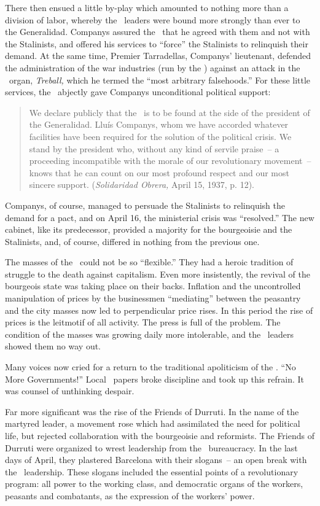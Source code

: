 There then ensued a little by-play which amounted to nothing more than a division of labor, whereby the \CNT\ leaders were bound more strongly than ever to the Generalidad. Companys assured the \CNT\ that he agreed with them and not with the Stalinists, and offered his services to ``force'' the Stalinists to relinquish their demand. At the same time, Premier Tarradellas, Companys’ lieutenant, defended the administration of the war industries (run by the \CNT) against an attack in the \PSUC\ organ, \emph{Treball,} which he termed the ``most arbitrary falsehoods.'' For these little services, the \CNT\ abjectly gave Companys unconditional political support:

\begin{quotation}
  We declare publicly that the \CNT\ is to be found at the side of the president of the Generalidad. Lluís Companys, whom we have accorded whatever facilities have been required for the solution of the political crisis. We stand by the president who, without any kind of servile praise~-- a proceeding incompatible with the morale of our revolutionary movement~-- knows that he can count on our most profound respect and our most sincere support. (\emph{Solidaridad Obrera,} April 15, 1937, p. 12).
\end{quotation}

Companys, of course, managed to persuade the Stalinists to relinquish the demand for a pact, and on April 16, the ministerial crisis was ``resolved.'' The new cabinet, like its predecessor, provided a majority for the bourgeoisie and the Stalinists, and, of course, differed in nothing from the previous one.

The masses of the \CNT\ could not be so ``flexible.'' They had a heroic tradition of struggle to the death against capitalism. Even more insistently, the revival of the bourgeois state was taking place on their backs. Inflation and the uncontrolled manipulation of prices by the businessmen ``mediating'' between the peasantry and the city masses now led to perpendicular price rises. In this period the rise of prices is the leitmotif of all activity. The press is full of the problem. The condition of the masses was growing daily more intolerable, and the \CNT\ leaders showed them no way out.

Many voices now cried for a return to the traditional apoliticism of the \CNT. ``No More Governments!'' Local \CNT\ papers broke discipline and took up this refrain. It was counsel of unthinking despair.

Far more significant was the rise of the Friends of Durruti. In the name of the martyred leader, a movement rose which had assimilated the need for political life, but rejected collaboration with the bourgeoisie and reformists. The Friends of Durruti were organized to wrest leadership from the \CNT\ bureaucracy. In the last days of April, they plastered Barcelona with their slogans~-- an open break with the \CNT\ leadership. These slogans included the essential points of a revolutionary program: all power to the working class, and democratic organs of the workers, peasants and combatants, as the expression of the workers’ power.

